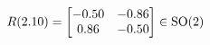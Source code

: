 \documentclass[preview]{standalone}
\begin{document}
\begin{align*}
\special{dvisvgm:raw <g id='unique000'>}R(2.10) = \begin{bmatrix} -0.50 & -0.86 \\ 0.86 & -0.50 \end{bmatrix} \in \text{SO}(2)\special{dvisvgm:raw </g>}
\end{align*}
\end{document}
